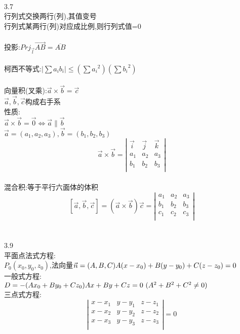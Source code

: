 \documentclass[11pt, a4paper, UTF8]{ctexart}
\begin{document}
\indent\\
3.7\\
行列式交换两行(列),其值变号\\
行列式某两行(列)对应成比例,则行列式值=0\\
\\
投影:$ Prj_{\vec{l}}\overrightarrow{AB}=\overline{AB} $\\
\\
柯西不等式:$ \mid\sum a_ib_i\mid\le(\sum {a_i}^2)(\sum {b_i}^2) $\\
\\
向量积(叉乘):$ \vec{a}\times\vec{b}=\vec{c} $\\
$ \vec{a},\vec{b},\vec{c} $构成右手系\\
性质:\\
$ \vec{a}\times\vec{b}=\vec{0}\Leftrightarrow\vec{a}\parallel\vec{b} $\\
$ \vec{a}=(a_1,a_2,a_3),\vec{b}=(b_1,b_2,b_3) $\\
\[\vec{a}\times\vec{b}=
\left| %
\begin{array}{lcr}
\vec{i}&\vec{j}&\vec{k}\\
a_1&a_2&a_3\\
b_1&b_2&b_3\\
\end{array}
\right|
\]\\
混合积:等于平行六面体的体积\\
\[
[\vec{a},\vec{b},\vec{c}]=(\vec{a}\times\vec{b})\vec{c}=
\left|\begin{array}{lcr}
a_1&a_2&a_3\\
b_1&b_2&b_3\\
c_1&c_2&c_3\\
\end{array}\right|
\]\\
\\
3.9\\
平面点法式方程:\\
$ P_0(x_0,y_0,z_0) $,法向量$ \vec{n}=(A,B,C)\\
A(x-x_0)+B(y-y_0)+C(z-z_0)=0 $\\
一般式方程:\\
$ D=-(Ax_0+By_0+Cz_0)\\
Ax+By+Cz=0\ (A^2+B^2+C^2\not=0) $\\
三点式方程:\\
\[
\left|\begin{array}{lcr}
x-x_1&y-y_1&z-z_1\\
x-x_2&y-y_2&z-z_2\\
x-x_3&y-y_3&z-z_3\\
\end{array}\right|=0
\]\\
\end{document}
